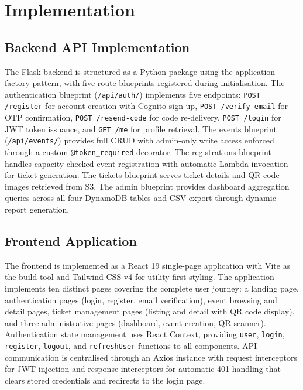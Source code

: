\documentclass[conference]{IEEEtran}
\begin{document}
\section{Implementation}

\subsection{Backend API Implementation}

The Flask backend is structured as a Python package using the application factory pattern, with five route blueprints registered during initialisation. The authentication blueprint (\texttt{/api/auth/}) implements five endpoints: \texttt{POST /register} for account creation with Cognito sign-up, \texttt{POST /verify-email} for OTP confirmation, \texttt{POST /resend-code} for code re-delivery, \texttt{POST /login} for JWT token issuance, and \texttt{GET /me} for profile retrieval. The events blueprint (\texttt{/api/events/}) provides full CRUD with admin-only write access enforced through a custom \texttt{@token\_required} decorator. The registrations blueprint handles capacity-checked event registration with automatic Lambda invocation for ticket generation. The tickets blueprint serves ticket details and QR code images retrieved from S3. The admin blueprint provides dashboard aggregation queries across all four DynamoDB tables and CSV export through dynamic report generation.

\subsection{Frontend Application}

The frontend is implemented as a React 19 single-page application with Vite as the build tool and Tailwind CSS v4 for utility-first styling. The application implements ten distinct pages covering the complete user journey: a landing page, authentication pages (login, register, email verification), event browsing and detail pages, ticket management pages (listing and detail with QR code display), and three administrative pages (dashboard, event creation, QR scanner). Authentication state management uses React Context, providing \texttt{user}, \texttt{login}, \texttt{register}, \texttt{logout}, and \texttt{refreshUser} functions to all components. API communication is centralised through an Axios instance with request interceptors for JWT injection and response interceptors for automatic 401 handling that clears stored credentials and redirects to the login page.
\end{document}
